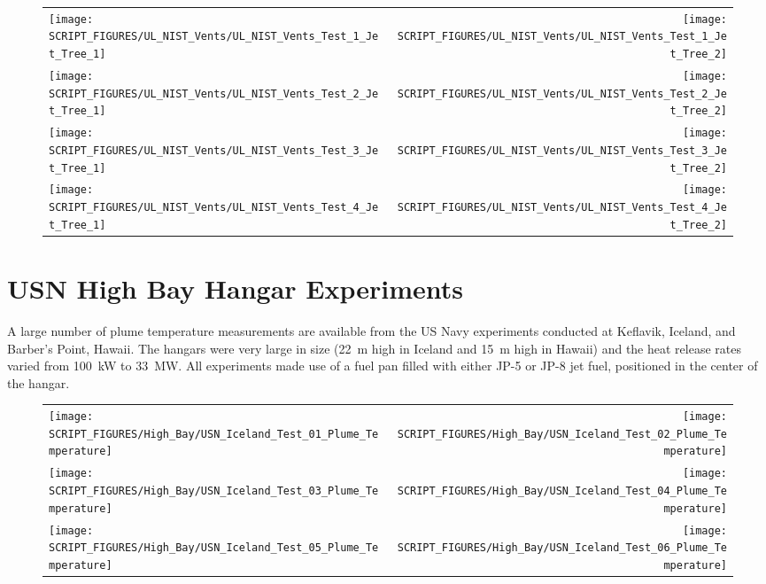 \begin{figure}[p]
\begin{tabular*}{\textwidth}{l@{\extracolsep{\fill}}r}
\texttt{[image: SCRIPT\_FIGURES/UL\_NIST\_Vents/UL\_NIST\_Vents\_Test\_1\_Jet\_Tree\_1]} &
\texttt{[image: SCRIPT\_FIGURES/UL\_NIST\_Vents/UL\_NIST\_Vents\_Test\_1\_Jet\_Tree\_2]} \\
\texttt{[image: SCRIPT\_FIGURES/UL\_NIST\_Vents/UL\_NIST\_Vents\_Test\_2\_Jet\_Tree\_1]} &
\texttt{[image: SCRIPT\_FIGURES/UL\_NIST\_Vents/UL\_NIST\_Vents\_Test\_2\_Jet\_Tree\_2]} \\
\texttt{[image: SCRIPT\_FIGURES/UL\_NIST\_Vents/UL\_NIST\_Vents\_Test\_3\_Jet\_Tree\_1]} &
\texttt{[image: SCRIPT\_FIGURES/UL\_NIST\_Vents/UL\_NIST\_Vents\_Test\_3\_Jet\_Tree\_2]} \\
\texttt{[image: SCRIPT\_FIGURES/UL\_NIST\_Vents/UL\_NIST\_Vents\_Test\_4\_Jet\_Tree\_1]} &
\texttt{[image: SCRIPT\_FIGURES/UL\_NIST\_Vents/UL\_NIST\_Vents\_Test\_4\_Jet\_Tree\_2]}
\end{tabular*}
\label{UL_NIST_Ceiling_Jet}
\end{figure}



\clearpage

\section{USN High Bay Hangar Experiments}

\label{USN_Plume}

A large number of plume temperature measurements are available from the US Navy experiments conducted at Keflavik, Iceland, and Barber's Point, Hawaii. The hangars were very large in size (22~m high in Iceland and 15~m high in Hawaii) and the heat release rates varied from 100~kW to 33~MW. All experiments made use of a fuel pan filled with either JP-5 or JP-8 jet fuel, positioned in the center of the hangar.


\begin{figure}[h!]
\begin{tabular*}{\textwidth}{l@{\extracolsep{\fill}}r}
\texttt{[image: SCRIPT\_FIGURES/High\_Bay/USN\_Iceland\_Test\_01\_Plume\_Temperature]} &
\texttt{[image: SCRIPT\_FIGURES/High\_Bay/USN\_Iceland\_Test\_02\_Plume\_Temperature]} \\
\texttt{[image: SCRIPT\_FIGURES/High\_Bay/USN\_Iceland\_Test\_03\_Plume\_Temperature]} &
\texttt{[image: SCRIPT\_FIGURES/High\_Bay/USN\_Iceland\_Test\_04\_Plume\_Temperature]} \\
\texttt{[image: SCRIPT\_FIGURES/High\_Bay/USN\_Iceland\_Test\_05\_Plume\_Temperature]} &
\texttt{[image: SCRIPT\_FIGURES/High\_Bay/USN\_Iceland\_Test\_06\_Plume\_Temperature]} \\
\end{tabular*}
\label{USN_Plume_Iceland_Plume_Temperature}
\end{figure}

